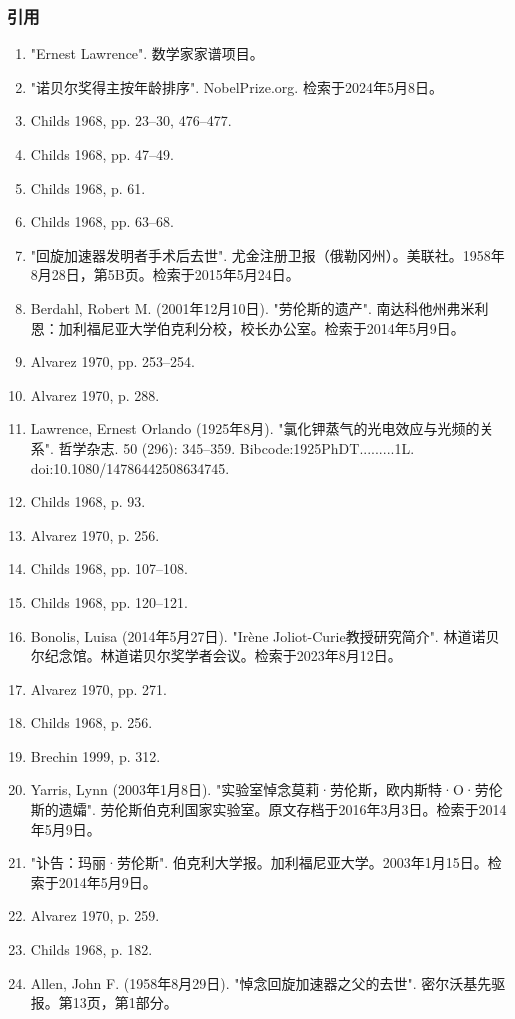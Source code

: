 \subsubsection{引用}
\begin{enumerate}
\item "Ernest Lawrence". 数学家家谱项目。
\item "诺贝尔奖得主按年龄排序". NobelPrize.org. 检索于2024年5月8日。
\item Childs 1968, pp. 23–30, 476–477.
\item Childs 1968, pp. 47–49.
\item Childs 1968, p. 61.
\item Childs 1968, pp. 63–68.
\item "回旋加速器发明者手术后去世". 尤金注册卫报（俄勒冈州）。美联社。1958年8月28日，第5B页。检索于2015年5月24日。
\item Berdahl, Robert M. (2001年12月10日). "劳伦斯的遗产". 南达科他州弗米利恩：加利福尼亚大学伯克利分校，校长办公室。检索于2014年5月9日。
\item Alvarez 1970, pp. 253–254.
\item Alvarez 1970, p. 288.
\item Lawrence, Ernest Orlando (1925年8月). "氯化钾蒸气的光电效应与光频的关系". 哲学杂志. 50 (296): 345–359. Bibcode:1925PhDT.........1L. doi:10.1080/14786442508634745.
\item Childs 1968, p. 93.
\item Alvarez 1970, p. 256.
\item Childs 1968, pp. 107–108.
\item Childs 1968, pp. 120–121.
\item Bonolis, Luisa (2014年5月27日). "Irène Joliot-Curie教授研究简介". 林道诺贝尔纪念馆。林道诺贝尔奖学者会议。检索于2023年8月12日。
\item Alvarez 1970, pp. 271.
\item Childs 1968, p. 256.
\item Brechin 1999, p. 312.
\item Yarris, Lynn (2003年1月8日). "实验室悼念莫莉·劳伦斯，欧内斯特·O·劳伦斯的遗孀". 劳伦斯伯克利国家实验室。原文存档于2016年3月3日。检索于2014年5月9日。
\item "讣告：玛丽·劳伦斯". 伯克利大学报。加利福尼亚大学。2003年1月15日。检索于2014年5月9日。
\item Alvarez 1970, p. 259.
\item Childs 1968, p. 182.
\item Allen, John F. (1958年8月29日). "悼念回旋加速器之父的去世". 密尔沃基先驱报。第13页，第1部分。

\end{enumerate}
